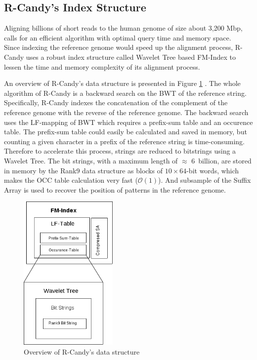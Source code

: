 \documentclass[11pt,a4paper]{report}
\begin{document}


\subsection{R-Candy's Index Structure} 
\label{R-Candy's Index Structure}

Aligning billions of short reads to the human genome of size about 3,200 Mbp, 
calls for an efficient algorithm with optimal query time and memory space.\\ 
Since indexing the reference genome would speed up the alignment process, 
R-Candy uses a robust index structure called Wavelet Tree based FM-Index to 
lessen the time and memory complexity of its alignment process.

An overview of R-Candy's data structure is presented in Figure \ref{DSOverview}
\cite{Wavthesis}. The whole algorithm of R-Candy is a backward search on the 
BWT of the reference string. Specifically, R-Candy indexes the concatenation of
the complement of the reference genome with the reverse of the reference genome. 
The backward search uses the LF-mapping of BWT which requires a prefix-sum table
and an occurence table. The prefix-sum table could easily be calculated and saved 
in memory, but counting a given character in a prefix of the reference string
is time-consuming. Therefore to accelerate this process, strings are reduced to 
bitstrings using a  Wavelet Tree. The bit strings, with a maximum length of 
$\approx$ 6~billion, are stored in memory by the Rank9 data structure as blocks 
of $10 \times 64$-bit words, which makes the OCC table calculation very fast 
($\mathcal{O}(1)$). And subsample of the Suffix Array is used to recover the 
position of patterns in the reference genome.


\begin{figure}[H]
\centering
\includegraphics[width=4.75cm]{pictures/DSOverview2.png}
\caption{Overview of R-Candy's data structure }
\label{DSOverview}
\end{figure}
\end{document}
